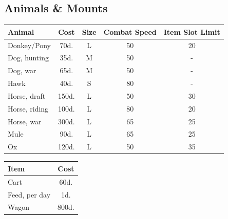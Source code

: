 \documentclass{book}
\begin{document}
\subsection*{Animals \& Mounts}\label{animals-mounts}

\begin{table}[ht]
    \begin{minipage}{.5\linewidth}
        \centering
        \begin{tabular}{lcccc}
            \toprule
                Animal & Cost & Size & Combat Speed & Item Slot Limit \\
            \midrule
                Donkey/Pony & 70d. & L & 50 & 20 \\
                Dog, hunting & 35d. & M & 50 & - \\
                Dog, war & 65d. & M & 50 & - \\
                Hawk & 40d. & S & 80 & - \\
                Horse, draft & 150d. & L & 50 & 30 \\
                Horse, riding & 100d. & L & 80 & 20 \\
                Horse, war & 300d. & L & 65 & 25 \\
                Mule & 90d. & L & 65 & 25 \\
                Ox & 120d. & L & 50 & 35 \\
            \bottomrule
        \end{tabular}
    \end{minipage}%
    \begin{minipage}{.5\linewidth}
        \flushright
        \begin{tabular}{lc}
            \toprule
                Item & Cost \\
            \midrule
                Cart & 60d. \\
                Feed, per day & 1d. \\
                Wagon & 800d. \\
            \bottomrule
        \end{tabular}
    \end{minipage}
\end{table}
\end{document}
